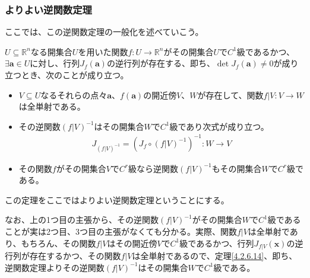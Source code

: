\documentclass[dvipdfmx]{jsarticle}
\begin{document}
\subsubsection{よりよい逆関数定理}%
ここでは、この逆関数定理の一般化を述べていこう。
\begin{thm}[よりよい逆関数定理]\label{4.4.2.1}
$U \subseteq \mathbb{R}^{n}$なる開集合$U$を用いた関数$f:U \rightarrow \mathbb{R}^{n}$がその開集合$U$で$C^{1}$級であるかつ、$\exists\mathbf{a} \in U$に対し、行列$J_{f}\left( \mathbf{a} \right)$の逆行列が存在する、即ち、$\det{J_{f}\left( \mathbf{a} \right)} \neq 0$が成り立つとき、次のことが成り立つ。
\begin{itemize}
\item
  $V \subseteq U$なるそれらの点々$\mathbf{a}$、$f\left( \mathbf{a} \right)$の開近傍$V$、$W$が存在して、関数$f|V:V \rightarrow W$は全単射である。
\item
  その逆関数$\left( f|V \right)^{- 1}$はその開集合$W$で$C^{1}$級であり次式が成り立つ。
\begin{align*}
J_{\left( f|V \right)^{- 1}} = \left( J_{f} \circ \left( f|V \right)^{- 1} \right)^{- 1}:W \rightarrow V
\end{align*}
\item
  その関数$f$がその開集合$V$で$C^{r}$級なら逆関数$\left( f|V \right)^{- 1}$もその開集合$W$で$C^{r}$級である。
\end{itemize}
この定理をここではよりよい逆関数定理ということにする。
\end{thm}\par
なお、上の1つ目の主張から、その逆関数$\left( f|V \right)^{- 1}$がその開集合$W$で$C^{1}$級であることが実は2つ目、3つ目の主張がなくても分かる。実際、関数$f|V$は全単射であり、もちろん、その関数$f|V$はその開近傍$V$で$C^{1}$級であるかつ、行列$J_{f|V}\left( \mathbf{x} \right)$の逆行列が存在するかつ、その関数$f|V$は全単射であるので、定理\ref{4.2.6.14}、即ち、逆関数定理よりその逆関数$\left( f|V \right)^{- 1}$はその開集合$W$で$C^{1}$級である。
\end{document}
